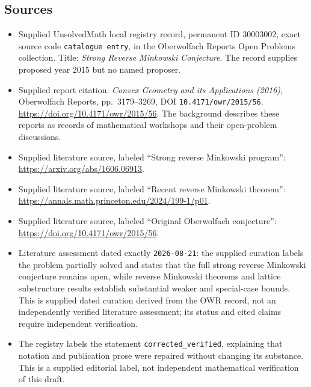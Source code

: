 \documentclass[11pt]{article}
\begin{document}
\subsection{Sources}
\begin{itemize}
\item Supplied UnsolvedMath local registry record, permanent ID \(30003002\), exact source code \texttt{catalogue entry}, in the Oberwolfach Reports Open Problems collection. Title: \emph{Strong Reverse Minkowski Conjecture}. The record supplies proposed year 2015 but no named proposer.
\item Supplied report citation: \emph{Convex Geometry and its Applications (2016)}, Oberwolfach Reports, pp.~3179--3269, DOI \texttt{10.4171/owr/2015/56}. \url{https://doi.org/10.4171/owr/2015/56}. The background describes these reports as records of mathematical workshops and their open-problem discussions.
\item Supplied literature source, labeled ``Strong reverse Minkowski program'': \url{https://arxiv.org/abs/1606.06913}.
\item Supplied literature source, labeled ``Recent reverse Minkowski theorem'': \url{https://annals.math.princeton.edu/2024/199-1/p01}.
\item Supplied literature source, labeled ``Original Oberwolfach conjecture'': \url{https://doi.org/10.4171/owr/2015/56}.
\item Literature assessment dated exactly \texttt{2026-08-21}: the supplied curation labels the problem partially solved and states that the full strong reverse Minkowski conjecture remains open, while reverse Minkowski theorems and lattice substructure results establish substantial weaker and special-case bounds. This is supplied dated curation derived from the OWR record, not an independently verified literature assessment; its status and cited claims require independent verification.
\item The registry labels the statement \texttt{corrected\_verified}, explaining that notation and publication prose were repaired without changing its substance. This is a supplied editorial label, not independent mathematical verification of this draft.
\end{itemize}
\end{document}
